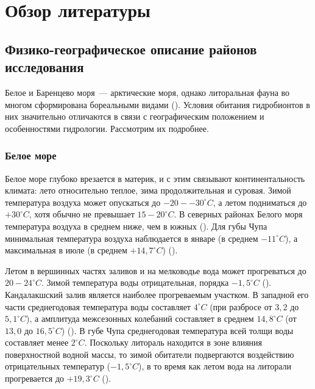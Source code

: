 	\chapter{Обзор литературы}



		\section{Физико-географическое описание районов исследования}

Белое и Баренцево моря~--- арктические моря, однако литоральная фауна во многом сформирована бореальными видами (\cite{Zenkevich_1963}).
Условия обитания гидробионтов в них значительно отличаются в связи с географическим положением и особенностями гидрологии.
Рассмотрим их подробнее.

	\subsection{Белое море}

Белое море глубоко врезается в материк, и с этим связывают континентальность климата: лето относительно теплое, зима продолжительная и суровая. 
Зимой температура воздуха может опускаться до $-20 - -30^{\circ}C$, а летом подниматься до $+30^{\circ}C$, хотя обычно не превышает $15-20^{\circ}C$. 
В северных районах Белого моря температура воздуха в среднем ниже, чем в южных (\cite{Babkov_Golikov_1984}). 
Для губы Чупа минимальная температура воздуха наблюдается в январе (в среднем $-11^{\circ}C$), а максимальная в июле (в среднем $+14,7^{\circ}C$) (\cite{Babkov_1982}). 

Летом в вершинных частях заливов и на мелководье вода может прогреваться до $20 - 24^{\circ}C$. 
Зимой температура воды отрицательная, порядка $-1,5^{\circ}C$ (\cite{Babkov_Golikov_1984}).
Кандалакшский залив является наиболее прогреваемым участком. 
В западной его части среднегодовая температура воды составляет $4^{\circ}C$ (при разбросе от $3,2$ до $5,1^{\circ}C$), а амплитуда межсезонных колебаний составляет в среднем $14,8^{\circ}C$ (от $13,0$ до $16,5^{\circ}C$) (\cite{Kuznecov_1960}). 
В губе Чупа среднегодовая температура всей толщи воды составляет менее $2^{\circ}C$. 
Поскольку литораль находится в зоне влияния поверхностной водной массы, то зимой обитатели подвергаются воздействию отрицательных температур ($-1,5^{\circ}C$), в то время как летом вода на литорали прогревается до $+19,3^{\circ}C$ (\cite{Babkov_1982}). 

